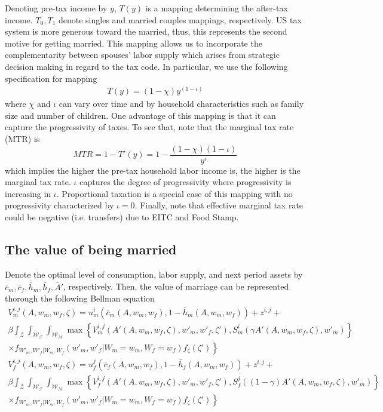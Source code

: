 Denoting pre-tax income by $y$, $T(y)$ is a mapping determining the after-tax income. $T_0, T_1$ denote singles and married couples mappings, respectively. US tax system is more generous toward the married, thus, this represents the second motive for getting married.  This mapping allows us to incorporate the complementarity between spouses' labor supply which arises from strategic decision making in regard to the tax code. In particular, we use the following specification for mapping  
\begin{align*}
T(y) = (1-\chi) y^{(1 - \iota)}
\end{align*}
where $\chi$ and $\iota$ can vary over time and by household characteristics such as family size and number of children. One advantage of this mapping is that it can capture the progressivity of taxes. To see that, note that the marginal tax rate (MTR) is 
\begin{equation*}
MTR = 1 - T'(y)= 1 - \dfrac{(1 - \chi)(1 - \iota)}{y^{\iota}}
\end{equation*}
which implies the higher the pre-tax household labor income is, the higher is the marginal tax rate. $\iota$ captures the degree of progressivity where progressivity is increasing in $\iota$. Proportional taxation is a special case of this mapping with no progressivity characterized by $\iota = 0$. Finally, note that effective marginal tax rate could be negative (i.e. transfers) due to EITC and Food Stamp. \\

\subsection{ The value of being married}
Denote the optimal level of consumption, labor supply, and next period assets by $\bar c_m, \bar c_f, \bar \bar h_m, \bar h_f, \bar A'$, respectively. Then, the value of marriage can be represented thorough the following Bellman equation 
\begin{align*}
V_m^{i,j}(A, w_m, w_f, \zeta) =  u_m^i(\bar c_m(A, w_m, w_f), 1 - \bar h_m(A, w_m, w_f)) + z^{i,j} + \\
 \beta  \int_{\mathcal{Z}} \int_{\mathcal{W_F}} \int_{\mathcal{W_M}} \max \left \{ V_m^{i,j}(A'(A, w_m, w_f, \zeta), w'_m, w'_f, \zeta'), S_m^i(\gamma A'(A, w_m, w_f, \zeta), w'_m)\right\} \\
\left. \times f_{W'_m, W'_f|W_m, W_f} \left (w'_m, w'_f| W_m = w_m, W_f = w_f \right) f_{\zeta}(\zeta')
\right \}
\end{align*}
\begin{align*}
V_f^{i,j}(A, w_m, w_f, \zeta) =  u_f^j(\bar c_f(A, w_m, w_f), 1 - \bar h_f(A, w_m, w_f)) + z^{i,j} + \\
 \beta \int_{\mathcal{Z}} \int_{\mathcal{W_F}} \int_{\mathcal{W_M}} \max \left \{ V_f^{i,j}(A'(A, w_m, w_f, \zeta), w'_m, w'_f, \zeta'), S_f^j((1 - \gamma) A'(A, w_m, w_f, \zeta), w'_m)\right\} \\
\left. \times f_{W'_m, W'_f|W_m, W_f} \left (w'_m, w'_f| W_m = w_m, W_f = w_f \right) f_{\zeta}(\zeta')
\right \}
\end{align*}

